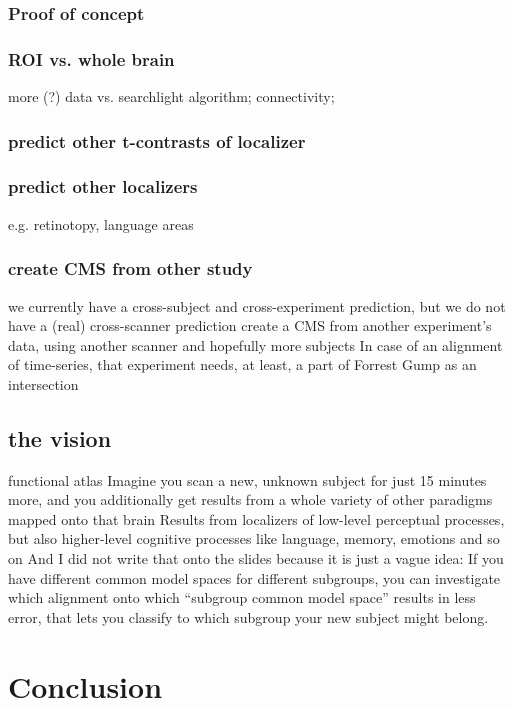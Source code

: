 \subsubsection{Proof of concept}
%


\subsubsection{ROI vs. whole brain}
%
more (?) data vs. searchlight algorithm; connectivity;
\citep{nastase2019leveraging}


\subsubsection{predict other t-contrasts of localizer}


\subsubsection{predict other localizers}
%
e.g. retinotopy, language areas


\subsubsection{create CMS from other study}
%
we currently have a cross-subject and cross-experiment prediction,
but we do not have a (real) cross-scanner prediction
%
create a CMS from another experiment’s data,
using another scanner and hopefully more subjects
%
In case of an alignment of time-series,
that experiment needs, at least, a part of Forrest Gump as an intersection


\subsection{the vision}
%
functional atlas
%
Imagine you scan a new, unknown subject for just 15 minutes more, and you
additionally get results from a whole variety of other paradigms mapped onto
that brain
%
Results from localizers of low-level perceptual processes, but also higher-level
cognitive processes like language, memory, emotions and so on
%
And I did not write that onto the slides because it is just a vague idea:
%
If you have different common model spaces for different subgroups, you can
investigate which alignment onto which ``subgroup common model space'' results
in less error, that lets you classify to which subgroup your new subject might
belong.


\section{Conclusion}
